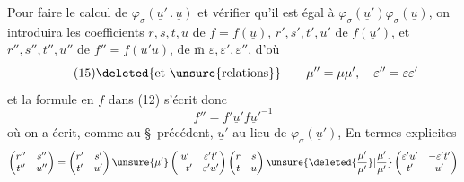 Pour faire le calcul de $\varphi_{\sigma}(\underline{u}'\mathbin{.}\underline{u})$ et vérifier qu'il est égal à $\varphi_{\sigma}(\underline{u}')\varphi_{\sigma}(\underline{u})$, on  introduira les coefficients $r,s,t,u$ de $f=f(\underline{u})$, $r',s',t',u'$ de  $f(\underline{u}')$, et $r'',s'',t'',u''$ de $f''=f(\underline{u}'\underline{u})$, de $\overline{\mathrm m}$  $\varepsilon,\varepsilon',\varepsilon''$, d'où
\[
\tag{15}
\deleted{\text{et }\unsure{\text{relations}}}\qquad
\mu''=\mu\mu',\quad \varepsilon''=\varepsilon\varepsilon'
\]
et la formule en $f$ dans (12) s'écrit donc
\[
\tag{16}
f''=f'\underline{u}'f\underline{u}'^{-1}
\]
où on a écrit, comme au \S\ précédent, $\underline{u}'$ au lieu de $\varphi_{\sigma}(\underline{u}')$,  En termes explicites
\[
\begin{pmatrix}r''&s''\\t''&u''\end{pmatrix}
=\begin{pmatrix}r'&s'\\t'&u'\end{pmatrix}
\unsure{\mu'}\begin{pmatrix}u'&\varepsilon't'\\-t'&\varepsilon'u'\end{pmatrix}
\begin{pmatrix}r&s\\t&u\end{pmatrix}
\unsure{\deleted{\frac{\mu'}{\mu'}}|\frac{\mu'}{\mu'}}
\begin{pmatrix}\varepsilon'u'&-\varepsilon't'\\t'&u'\end{pmatrix}
\]


